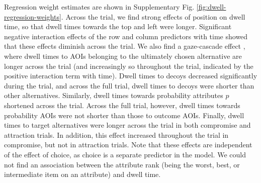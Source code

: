 \documentclass[11pt, a4paper]{article}
\begin{document}
\begin{refsection}
Regression weight estimates are shown in Supplementary Fig. \ref{fig:dwell-regression-weights}. Across the trial, we find strong effects of position on dwell time, so that dwell times towards the top and left were longer. Significant negative interaction effects of the row and column predictors with time showed that these effects diminish across the trial. We also find a gaze-cascade effect \parencite{mullett2016ImplicationsVisualAttention,shimojo2003GazeBiasBoth}, where dwell times to AOIs belonging to the ultimately chosen alternative are longer across the trial (and increasingly so throughout the trial, indicated by the positive interaction term with time). Dwell times to decoys decreased significantly during the trial, and across the full trial, dwell times to decoys were shorter than other alternatives. Similarly, dwell times towards probability attributes $p$ shortened across the trial. Across the full trial, however, dwell times towards probability AOIs were not shorter than those to outcome AOIs. Finally, dwell times to target alternatives were longer across the trial in both compromise and attraction trials. In addition, this effect increased throughout the trial in compromise, but not in attraction trials. Note that these effects are independent of the effect of choice, as choice is a separate predictor in the model. We could not find an association between the attribute rank (being the worst, best, or intermediate item on an attribute) and dwell time.


\end{refsection}
\end{document}
